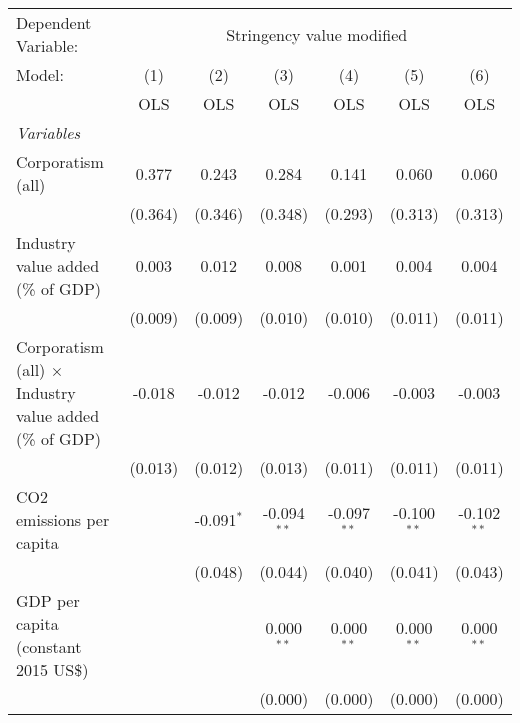 
\begingroup
\centering
\begin{tabular}{lcccccc}
   \toprule
   Dependent Variable: & \multicolumn{6}{c}{Stringency value modified}\\
   Model:                                                        & (1)     & (2)          & (3)           & (4)           & (5)           & (6)\\  
                                                                 &  OLS    & OLS          & OLS           & OLS           & OLS           & OLS\\  
   \midrule
   \emph{Variables}\\
   Corporatism (all)                                             & 0.377   & 0.243        & 0.284         & 0.141         & 0.060         & 0.060\\   
                                                                 & (0.364) & (0.346)      & (0.348)       & (0.293)       & (0.313)       & (0.313)\\   
   Industry value added (\% of GDP)                              & 0.003   & 0.012        & 0.008         & 0.001         & 0.004         & 0.004\\   
                                                                 & (0.009) & (0.009)      & (0.010)       & (0.010)       & (0.011)       & (0.011)\\   
   Corporatism (all) $\times$ Industry value added (\% of GDP)   & -0.018  & -0.012       & -0.012        & -0.006        & -0.003        & -0.003\\   
                                                                 & (0.013) & (0.012)      & (0.013)       & (0.011)       & (0.011)       & (0.011)\\   
   CO2 emissions per capita                                      &         & -0.091$^{*}$ & -0.094$^{**}$ & -0.097$^{**}$ & -0.100$^{**}$ & -0.102$^{**}$\\   
                                                                 &         & (0.048)      & (0.044)       & (0.040)       & (0.041)       & (0.043)\\   
   GDP per capita (constant 2015 US\$)                           &         &              & 0.000$^{**}$  & 0.000$^{**}$  & 0.000$^{**}$  & 0.000$^{**}$\\   
                                                                 &         &              & (0.000)       & (0.000)       & (0.000)       & (0.000)\\   

\end{tabular}
